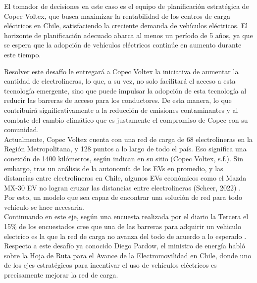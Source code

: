 \documentclass[letterpaper]{article}
\begin{document}
\begin{flushleft}
		El tomador de decisiones en este caso es el equipo de planificación estratégica de Copec Voltex, que busca maximizar la rentabilidad de los centros de carga eléctricos en Chile, satisfaciendo la creciente demanda de vehículos eléctricos. El horizonte de planificación adecuado abarca al menos un período de 5 años, ya que se espera que la adopción de vehículos eléctricos continúe en aumento durante este tiempo. 

		Resolver este desafío le entregará a Copec Voltex la iniciativa de aumentar la cantidad de electrolineras, lo que, a su vez, no solo facilitará el acceso a esta tecnología emergente, sino que puede impulsar la adopción de esta tecnología al reducir las barreras de acceso para los conductores. De esta manera, lo que contribuirá significativamente a la reducción de emisiones contaminantes y al combate del cambio climático que es justamente el compromiso de Copec con su comunidad. \\

		Actualmente, Copec Voltex cuenta con una red de carga de 68 electrolineras en la Región Metropolitana, y 128 puntos a lo largo de todo el país. Eso significa una conexión de 1400 kilómetros, según indican en su sitio (Copec Voltex, s.f.). Sin embargo, tras un análisis de la autonomía de los EVs en promedio, y las distancias entre electrolineras en Chile, algunos EVs económicos como el Mazda MX-30 EV no logran cruzar las distancias entre electrolineras (Scheer, 2022) \cite{scheer}. Por esto, un modelo que sea capaz de encontrar una solución de red para todo vehículo se hace necesaria. \\

		Continuando en este eje, según una encuesta realizada por el diario la Tercera el 15\% de los encuestados cree que una de las barreras para adquirir un vehiculo electrico es la que la red de carga no avanza del todo de acuerdo a lo esperado \cite{Tercera}. Respecto a este desafío ya conocido Diego Pardow, el ministro de energía habló sobre la Hoja de Ruta para el Avance de la Electromovilidad en Chile, donde uno de los ejes estratégicos para incentivar el uso de vehículos eléctricos es precisamente mejorar la red de carga.


\end{flushleft}
\end{document}

